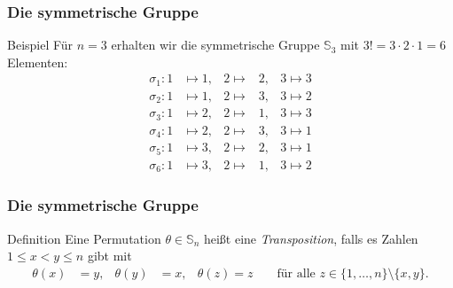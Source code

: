 \documentclass{beamer}
\renewcommand{\emph}[1]{{\textcolor{solarizedRed}{\itshape #1}}}
\renewcommand\SS{\mathbb S}
\newcommand{\ue}{\"u}
\begin{document}
\begin{frame}
\end{frame}

\begin{frame}\frametitle{Die symmetrische Gruppe}
	\begin{block}{Beispiel}
		F\ue r $n=3$ erhalten wir die symmetrische Gruppe $\SS_3$ mit $3!=3\cdot2\cdot1=6$ Elementen:
		\begin{align*}
			\sigma_1:1&\mapsto 1,&2\mapsto&2,&3\mapsto3\\
			\sigma_2:1&\mapsto 1,&2\mapsto&3,&3\mapsto2\\
			\sigma_3:1&\mapsto 2,&2\mapsto&1,&3\mapsto3\\
			\sigma_4:1&\mapsto 2,&2\mapsto&3,&3\mapsto1\\
			\sigma_5:1&\mapsto 3,&2\mapsto&2,&3\mapsto1\\
			\sigma_6:1&\mapsto 3,&2\mapsto&1,&3\mapsto2
		\end{align*}
	\end{block}
\end{frame}

\begin{frame}\frametitle{Die symmetrische Gruppe}
	\begin{block}{Definition}
		Eine Permutation $\theta\in\SS_n$ hei\ss t eine \emph{Transposition}, falls es Zahlen $1\leq x<y\leq n$ gibt mit
		\begin{align*}
			\theta(x)&=y,&\theta(y)&=x,&\theta(z)=z&&\mbox{ f\ue r alle }z\in\{1,\ldots,n\}\setminus\{x,y\}.
		\end{align*}
	\end{block}
\end{frame}
\end{document}
